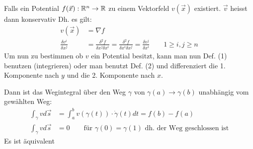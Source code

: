 \documentclass[a4paper]{article}
\begin{document}
		\begin{fdef}[Potential]
			Falls ein Potential $f(\vec x): \mathbb{R}^n \rightarrow \mathbb{R}$ zu einem Vektorfeld $v(\vec x)$ existiert. $\vec v$ heisst dann konservativ Dh. es gilt:
			\begin{align}
				v(\vec x) &= \nabla f \\
				\frac{\delta v^i}{\delta x^j} &= \frac{\delta^2 f}{\delta x^j \delta x^i} = \frac{\delta^2 f}{\delta x^i \delta x^j} = \frac{\delta v^j}{\delta x^i} \qquad 1 \geq i,j \geq n
			\end{align}
			Um nun zu bestimmen ob $v$ ein Potential besitzt, kann man nun Def. (1) benutzen (integrieren) oder man benutzt Def. (2) und differenziert die 1. Komponente nach $y$ und die 2. Komponente nach $x$. 
			

			Dann ist das Wegintegral über den Weg $\gamma$ von $\gamma(a) \rightarrow \gamma(b)$ unabhängig vom gewählten Weg:
			\begin{align*}
				\int_\gamma v d\vec s &= \int_a^b v(\gamma(t)) \cdot \dot \gamma (t) dt = f(b) - f(a) \\
				\int_\gamma v d\vec s &= 0 \qquad \text{für } \gamma(0) = \gamma(1) \text{ dh. der Weg geschlossen ist}
			\end{align*}
			Es ist äquivalent
			
		\end{fdef}
\end{document}
